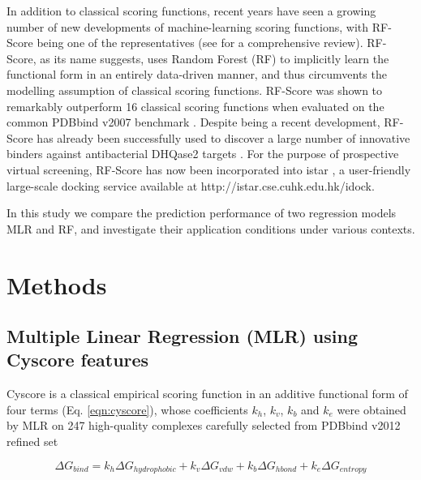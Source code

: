 \documentclass[journal=jacsat,manuscript=article]{achemso}
\begin{document}
In addition to classical scoring functions, recent years have seen a growing number of new developments of machine-learning scoring functions, with RF-Score \cite{564} being one of the representatives (see \cite{1373} for a comprehensive review). RF-Score, as its name suggests, uses Random Forest (RF) \cite{1309} to implicitly learn the functional form in an entirely data-driven manner, and thus circumvents the modelling assumption of classical scoring functions. RF-Score was shown to remarkably outperform 16 classical scoring functions when evaluated on the common PDBbind v2007 benchmark \cite{564}. Despite being a recent development, RF-Score has already been successfully used to discover a large number of innovative binders against antibacterial DHQase2 targets \cite{1281}. For the purpose of prospective virtual screening, RF-Score has now been incorporated into istar \cite{1362}, a user-friendly large-scale docking service available at http://istar.cse.cuhk.edu.hk/idock.

In this study we compare the prediction performance of two regression models MLR and RF, and investigate their application conditions under various contexts.

\section{Methods}


\subsection{Multiple Linear Regression (MLR) using Cyscore features}

Cyscore is a classical empirical scoring function in an additive functional form of four terms (Eq. \ref{eqn:cyscore}), whose coefficients $k_h$, $k_v$, $k_b$ and $k_e$ were obtained by MLR on 247 high-quality complexes carefully selected from PDBbind v2012 refined set%

\begin{equation}
\Delta G_{bind} = k_h\Delta G_{hydrophobic} + k_v\Delta G_{vdw} + k_b\Delta G_{hbond} + k_e\Delta G_{entropy}
\label{eqn:cyscore}
\end{equation}
\end{document}
